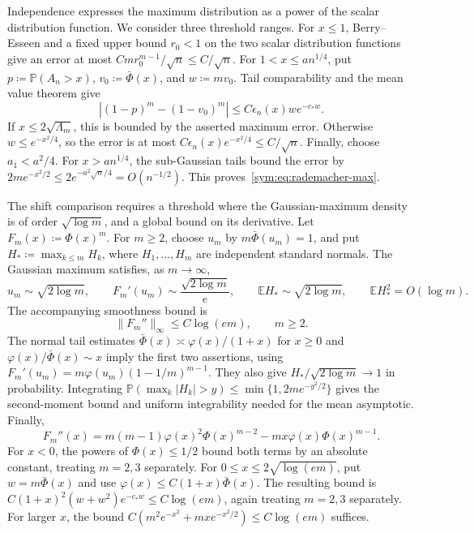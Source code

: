 \documentclass[11pt,letterpaper]{article}
\theoremstyle{remark}
\newcommand{\E}{\mathbb E}
\newcommand{\Pp}{\mathbb P}
\begin{document}
Independence expresses the maximum distribution as a power of the
scalar distribution function. We consider three threshold ranges.
For \(x\le1\),
Berry--Esseen and a fixed upper bound \(r_0<1\) on the two scalar
distribution functions give an error at most
\(Cm r_0^{m-1}/\sqrt n\le C/\sqrt n\). For
\(1<x\le an^{1/4}\), put \(p\coloneqq\Pp(A_n>x)\),
\(v_0\coloneqq\bar\Phi(x)\), and \(w\coloneqq mv_0\).
Tail comparability and the mean value theorem give
\[
 |(1-p)^m-(1-v_0)^m|\le C\epsilon_n(x)w e^{-c_*w}.
\]
If \(x\le2\sqrt{\Lambda_m}\), this is bounded by the asserted
maximum error. Otherwise \(w\le e^{-x^2/4}\), so the error is
at most \(C\epsilon_n(x)e^{-x^2/4}\le C/\sqrt n\).
Finally, choose \(a_1<a^2/4\). For \(x>an^{1/4}\), the
sub-Gaussian tails bound the error by
\(2m e^{-x^2/2}\le2e^{-a^2\sqrt n/4}=O(n^{-1/2})\).
This proves~\eqref{sym:eq:rademacher-max}.

The shift comparison requires a threshold where the Gaussian-maximum
density is of order \(\sqrt{\log m}\), and a global bound on its
derivative. Let
\(F_m(x)\coloneqq\Phi(x)^m\). For \(m\ge2\), choose \(u_m\) by
\(m\bar\Phi(u_m)=1\), and put \(H_*\coloneqq\max_{k\le m}H_k\), where $H_1,\dots,H_m$ are independent standard normals. The Gaussian maximum satisfies, as \(m\to\infty\),
\begin{equation}
 u_m\sim\sqrt{2\log m},\qquad
 F_m'(u_m)\sim\frac{\sqrt{2\log m}}e,\qquad
 \E H_*\sim\sqrt{2\log m},\qquad \E H_*^2=O(\log m).
 \label{sym:eq:gaussian-max}
\end{equation}
The accompanying smoothness bound is
\begin{equation}
 \|F_m''\|_\infty\le C\log(em),\qquad m\ge2.
 \label{sym:eq:gaussian-smoothness}
\end{equation}
The normal tail estimates
\(\bar\Phi(x)\asymp\varphi(x)/(1+x)\) for \(x\ge0\) and
\(\varphi(x)/\bar\Phi(x)\sim x\) imply the first two assertions,
using \(F_m'(u_m)=m\varphi(u_m)(1-1/m)^{m-1}\).
They also give \(H_*/\sqrt{2\log m}\to1\) in probability.
Integrating \(\Pp(\max_k|H_k|>y)\le\min\{1,2me^{-y^2/2}\}\)
gives the second-moment bound and uniform integrability needed for
the mean asymptotic. Finally,
\[
 F_m''(x)=m(m-1)\varphi(x)^2\Phi(x)^{m-2}
             -mx\varphi(x)\Phi(x)^{m-1}.
\]
For \(x<0\), the powers of \(\Phi(x)\le1/2\) bound both terms
by an absolute constant, treating \(m=2,3\) separately. For
\(0\le x\le2\sqrt{\log(em)}\), put \(w=m\bar\Phi(x)\) and use
\(\varphi(x)\le C(1+x)\bar\Phi(x)\). The resulting bound is
\(C(1+x)^2(w+w^2)e^{-c_*w}\le C\log(em)\), again treating
\(m=2,3\) separately. For larger \(x\), the bound
\(C(m^2e^{-x^2}+mx e^{-x^2/2})\le C\log(em)\) suffices.
\end{document}
